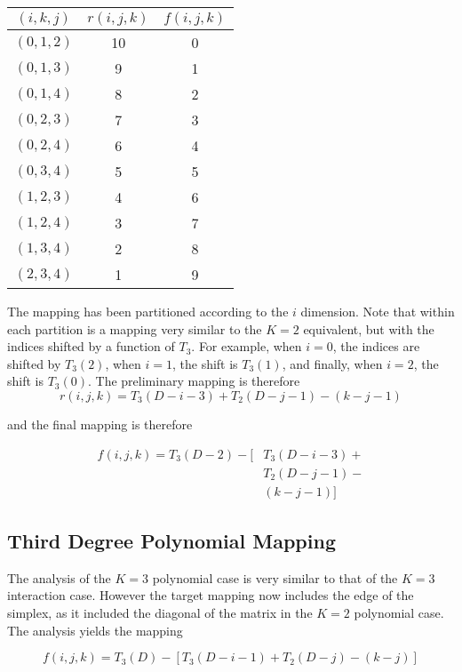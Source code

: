 \documentclass{article}
\begin{document}
\begin{tabular}{| c | c | c |}
  \hline
  $(i, k, j)$ & $r(i,j,k)$ & $f(i,j,k)$ \\
  \hline
  $(0, 1, 2)$ & 10 & 0 \\
  $(0, 1, 3)$ & 9 & 1 \\
  $(0, 1, 4)$ & 8 & 2 \\
  $(0, 2, 3)$ & 7 & 3 \\
  $(0, 2, 4)$ & 6 & 4 \\
  $(0, 3, 4)$ & 5 & 5 \\
  \hline
  $(1, 2, 3)$ & 4 & 6 \\
  $(1, 2, 4)$ & 3 & 7 \\
  $(1, 3, 4)$ & 2 & 8 \\
  \hline
  $(2, 3, 4)$ & 1 & 9 \\
  \hline  
\end{tabular}

The mapping has been partitioned according to the $i$ dimension.
Note that within each partition is a mapping very similar to the $K=2$ equivalent, but with the indices shifted by a function of $T_3$.
For example, when $i=0$, the indices are shifted by $T_3(2)$, when $i=1$, the shift is $T_3(1)$, and finally, when $i=2$, the shift is $T_3(0)$.
The preliminary mapping is therefore
\begin{equation}
r(i, j, k) = T_3(D-i-3) + T_2(D-j-1) - (k-j-1)
\end{equation}

and the final mapping is therefore

\begin{align}
f(i, j, k) = T_3(D-2) - [&T_3(D-i-3) + \\
                         &T_2(D-j-1) - \\
                         &(k-j-1)]
\end{align}

\subsection{Third Degree Polynomial Mapping}
The analysis of the $K=3$ polynomial case is very similar to that of the $K=3$ interaction case.
However the target mapping now includes the edge of the simplex, as it included the diagonal of the matrix in the $K=2$ polynomial case.
The analysis yields the mapping

\begin{equation}
f(i, j, k) = T_3(D) - [T_3(D-i-1) + T_2(D-j) - (k-j)]
\end{equation}
\end{document}

